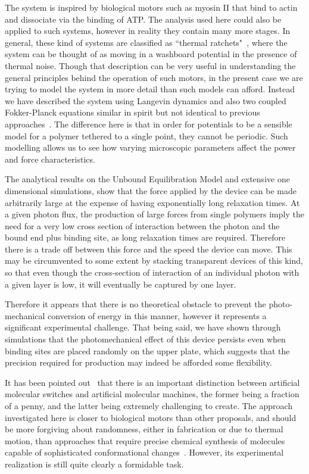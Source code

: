 \documentclass[11pt]{ucthesis}
\begin{document}
The system is inspired by biological motors such as myosin II that bind
to actin and dissociate via the binding of ATP. The analysis used here
could also be applied to such systems, however in reality they contain
many more stages. In general, these kind of systems are classified as 
``thermal ratchets"~\cite{ReimannRev}, where the system can be thought of as moving in a
washboard potential in the presence of thermal noise. Though that description
can be very useful in understanding the general principles behind
the operation of such motors, in the present case we are trying to model
the system in more detail than such models can afford. Instead we have described
the system using Langevin dynamics and also two coupled Fokker-Planck equations similar
in spirit but not identical to previous approaches~\cite{ProstPRL,BustamanteKellerOster}. The difference
here is that in order for potentials to be a sensible model for a polymer tethered
to a single point, they cannot be periodic. Such modelling allows us to
see how varying microscopic parameters affect the power and force
characteristics. 

The analytical results on the Unbound Equilibration Model and extensive one
dimensional simulations, show that the force
applied by the device can be made arbitrarily large at the expense of having
exponentially long relaxation times. At a given photon flux, the production of large forces 
from single polymers imply the need for a very low 
cross section of interaction between the photon and the bound end plus binding
site, as long relaxation times are required. Therefore there is a trade off between this force
and the speed the device can move. This may be circumvented to some extent by
stacking transparent devices of this kind, so that even though the cross-section of interaction of an
individual photon with a given layer is low, it will eventually be captured
by one layer. 

Therefore it appears that there is no theoretical obstacle to prevent
the photo-mechanical conversion of energy in this manner, however
it represents a significant experimental challenge. That being said, we have shown through simulations that the photomechanical effect of this device persists even when binding sites are placed randomly on the upper plate, which suggests that the precision required for production may indeed be afforded some flexibility.

It has been pointed out~\cite{GrzybowskiReview} that there is an important
distinction between artificial molecular switches and artificial molecular
machines, the former being a fraction of a penny, and the latter being extremely
challenging to create. The approach investigated here is closer to biological
motors than other proposals, and should be more forgiving about randomness, either 
in fabrication or due to thermal motion, than approaches that require precise chemical synthesis
of molecules capable of sophisticated conformational changes~\cite{credi2006}.
However, its experimental realization is still quite clearly a formidable task.
\end{document}

